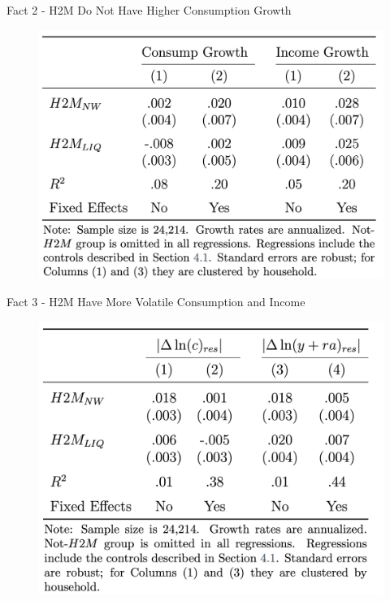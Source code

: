 \documentclass{beamer}
\begin{document}
\begin{frame}{Fact 2 - 
	H2M Do Not Have Higher Consumption Growth}
	\label{fact2}
	\begin{figure}
		\centering
		\includegraphics[width=0.7\linewidth]{Figures/Table4.png}
	\end{figure}

\hyperlink{canonical}{}
\end{frame}
\begin{frame}{Fact 3 - H2M Have More Volatile Consumption and Income}
	\label{fact3}
	\begin{figure}
		\centering
		\includegraphics[width=0.7\linewidth]{Figures/Table5.png}
	\end{figure}
	
\hyperlink{canonical}{}
\end{frame}
\end{document}
